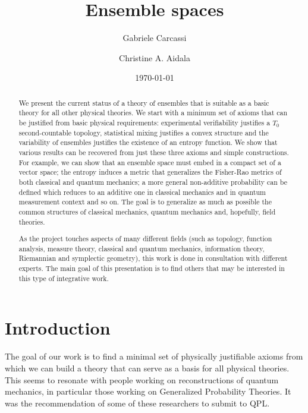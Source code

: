 \documentclass[10pt,twocolumn, nofootinbib]{revtex4-2}
\begin{document}
\title{Ensemble spaces}
\author{Gabriele Carcassi}
\author{Christine A. Aidala}

\date{\today}


\begin{abstract}
	We present the current status of a theory of ensembles that is suitable as a basic theory for all other physical theories. We start with a minimum set of axioms that can be justified from basic physical requirements: experimental verifiability justifies a $T_0$ second-countable topology, statistical mixing justifies a convex structure and the variability of ensembles justifies the existence of an entropy function. We show that various results can be recovered from just these three axioms and simple constructions. For example, we can show that an ensemble space must embed in a compact set of a vector space; the entropy induces a metric that generalizes the Fisher-Rao metrics of both classical and quantum mechanics; a more general non-additive probability can be defined which reduces to an additive one in classical mechanics and in quantum measurement context and so on. The goal is to generalize as much as possible the common structures of classical mechanics, quantum mechanics and, hopefully, field theories.

	As the project touches aspects of many different fields (such as topology, function analysis, measure theory, classical and quantum mechanics, information theory, Riemannian and symplectic geometry), this work is done in consultation with different experts. The main goal of this presentation is to find others that may be interested in this type of integrative work. 
\end{abstract}

\maketitle


\section{Introduction}

The goal of our work is to find a minimal set of physically justifiable axioms from which we can build a theory that can serve as a basis for all physical theories. This seems to resonate with people working on reconstructions of quantum mechanics, in particular those working on Generalized Probability Theories. It was the recommendation of some of these researchers to submit to QPL.
\end{document}
